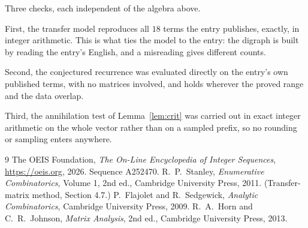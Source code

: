 \documentclass[11pt,a4paper]{article}
\theoremstyle{plain}
\theoremstyle{definition}
\begin{document}
Three checks, each independent of the algebra above.

First, the transfer model reproduces all $18$ terms the entry publishes, exactly, in
integer arithmetic. This is what ties the model to the entry: the digraph is built by reading
the entry's English, and a misreading gives different counts.

Second, the conjectured recurrence was evaluated directly on the entry's own published terms,
with no matrices involved, and holds wherever the proved range and the data overlap.

Third, the annihilation test of Lemma~\ref{lem:crit} was carried out in exact integer
arithmetic on the whole vector rather than on a sampled prefix, so no rounding or sampling
enters anywhere.

\begin{thebibliography}{9}
 The OEIS Foundation, \emph{The On-Line Encyclopedia of Integer
Sequences}, \url{https://oeis.org}, 2026. Sequence A252470.
 R.~P.~Stanley, \emph{Enumerative Combinatorics}, Volume 1, 2nd ed.,
Cambridge University Press, 2011. (Transfer-matrix method, Section 4.7.)
 P.~Flajolet and R.~Sedgewick, \emph{Analytic Combinatorics}, Cambridge
University Press, 2009.
 R.~A.~Horn and C.~R.~Johnson, \emph{Matrix Analysis}, 2nd ed., Cambridge
University Press, 2013.
\end{thebibliography}
\end{document}
